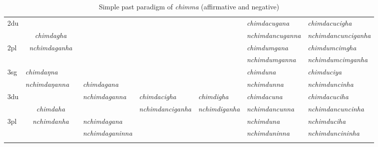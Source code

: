 \begin{sidewaystable}[p]
{\begin{tabular}{l|p{2.4cm}|p{2.0cm}|p{2.6cm}|p{2.6cm}|p{2.6cm}|p{3.2cm}|p{3.2cm}}
 \cline{1-2} \cline{7-8}			
{\sc 2du}		& \multicolumn{2}{c|}{}     &  \multicolumn{3}{c|}{\cellcolor[gray]{.8}} & \it  chimdacugana  & \it   chimdacucigha \\
		&  	\multicolumn{2}{c|}{\it chimdagha} & \multicolumn{3}{c|}{ \cellcolor[gray]{.8}}& \it nchimdancuganna  & \it  nchimdancunciganha \\
 \cline{1-1} \cline{7-8}			
{\sc 2pl}		& 	\multicolumn{2}{c|}{\it nchimdaganha} &  \multicolumn{3}{c|}{ \cellcolor[gray]{.8}}& \it  chimdumgana& \it  chimdumcimgha  \\
		& \multicolumn{2}{c|}{ }&  \multicolumn{3}{c|}{\cellcolor[gray]{.8} }& \it  nchimdumganna & \it  nchimdumcimganha \\
\hline			
{\sc 3sg} 		& \it chimdaŋna	  & \it 	      	& \it   			& \it     & \it     	& \it chimduna& \it chimduciya\\
		& \it  nchimdaŋanna   & \it    	& \it  chimdagana	& \it   & \it    & \it nchimdunna& \it nchimduncinha\\
  \cline{1-2}  \cline{7-8}					
{\sc 3du}&   \multicolumn{2}{c|}{}& \it nchimdaganna& \it  chimdacigha& \it chimdigha& \it   chimdacuna & \it   chimdacuciha\\
	& \multicolumn{2}{c|}{\it chimdaha}& \it  & \it nchimdanciganha& \it  nchimdiganha & \it  nchimdancunna & \it  nchimdancuncinha\\
 \cline{1-1} \cline{4-4} \cline{7-8}	
{\sc 3pl} &  \multicolumn{2}{c|}{\it nchimdanha}	& \it nchimdagana& \it  & \it  & \it nchimduna& \it nchimduciha\\	
	& \multicolumn{2}{c|}{ }& \it nchimdaganinna& \it & \it  & \it nchimduninna& \it nchimduncininha \\
\lspbottomrule
\end{tabular}
}
\caption{Simple past paradigm of \emph{chimma}  (affirmative and negative)}\label{par-chimd-pst}
\end{sidewaystable}



